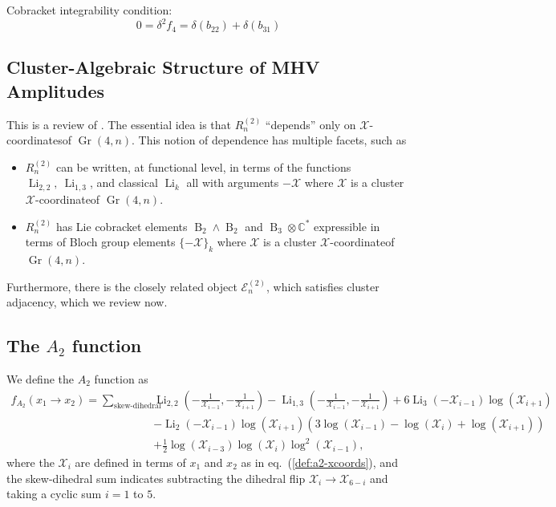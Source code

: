 \documentclass[11pt]{article}
\DeclareMathOperator{\B}{B}
\DeclareMathOperator{\Gr}{Gr}
\DeclareMathOperator{\Li}{Li}
\def\x{\mathcal{X}}
\def\xcoord{$\mathcal{X}$-coordinate}
\def\xcoords{$\mathcal{X}$-coordinates}
\def\pdfeq#1{\texorpdfstring{$#1$}{a}}
\begin{document}
Cobracket integrability condition:
\begin{equation} \label{eq:integrability}
	0 = \delta^2 f_4 = \delta(b_{22}) + \delta(b_{31})
\end{equation}


\subsection{Cluster-Algebraic Structure of MHV Amplitudes}\label{sec:cluster-algebra-R2n}

This is a review of \cite{Golden:2013xva,Golden:2014xqa,Golden:2014pua}. The essential idea is that $R^{(2)}_n$ ``depends'' only on \xcoords of $\Gr(4,n)$. This notion of dependence has multiple facets, such as 
\begin{itemize}
	\item $R^{(2)}_n$ can be written, at functional level, in terms of the functions $\Li_{2,2},~\Li_{1,3}$, and classical $\Li_k$ all with arguments $-\mathcal{X}$ where $\mathcal{X}$ is a cluster \xcoord of $\Gr(4,n)$.
	\item $R^{(2)}_n$ has Lie cobracket elements $\B_2 \wedge \B_2$ and $\B_3 \otimes \mathbb{C}^*$ expressible in terms of Bloch group elements $\{-\mathcal{X}\}_k$ where $\mathcal{X}$ is a cluster \xcoord of $\Gr(4,n)$. 
\end{itemize}

Furthermore, there is the closely related object $\mathcal{E}^{(2)}_n$, which satisfies cluster adjacency, which we review now.

\subsection{The \pdfeq{A_2} function}
We define the $A_2$ function as
\begin{equation}\label{def:a2-function}
\begin{split}
	f_{A_2}(x_1 \to x_2)  = \sum_{\text{skew-dihedral}} &\Li_{2,2}\left(-\frac{1}{\x_{i-1}},-\frac{1}{\x_{i+1}}\right) - \Li_{1,3}\left(-\frac{1}{\x_{i-1}},-\frac{1}{\x_{i+1}}\right)+6 \Li_3\left(-\x_{i-1}\right) \log \left(\x_{i+1}\right)
	\\&-\Li_2\left(-\x_{i-1}\right) \log \left(\x_{i+1}\right) \left(3 \log \left(\x_{i-1}\right)-\log \left(\x_i\right)+\log \left(\x_{i+1}\right)\right)
	\\&+\frac{1}{2} \log \left(\x_{i-3}\right) \log \left(\x_i\right) \log^2\! \left(\x_{i-1}\right),
\end{split}
\end{equation}
where the $\x_i$ are defined in terms of $x_1$ and $x_2$ as in eq.~(\ref{def:a2-xcoords}), and the skew-dihedral sum indicates subtracting the dihedral flip $\x_i \to \x_{6-i}$ and taking a cyclic sum $i=1$ to $5$.
\end{document}
